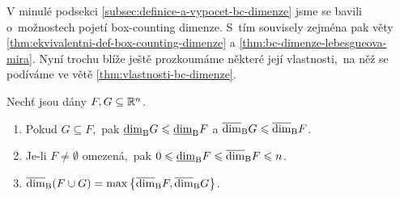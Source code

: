 V minulé podsekci \ref{subsec:definice-a-vypocet-bc-dimenze} jsme se bavili o~možnostech pojetí box-counting dimenze. S~tím souvisely zejména pak věty \ref{thm:ekvivalentni-def-box-counting-dimenze} a \ref{thm:bc-dimenze-lebesgueova-mira}. Nyní trochu blíže ještě prozkoumáme některé její vlastnosti,~na něž se podíváme ve větě \ref{thm:vlastnosti-bc-dimenze}.
\begin{theorem}\label{thm:vlastnosti-bc-dimenze}
    Nechť jsou dány $F,G\subseteq\mathbb{R}^n$.
    \begin{enumerate}[label=(\roman*)]
        \item\label{thm:monotonie-bc-dimenze} Pokud $G\subseteq F$,~pak $\underline{\dim}_\textup{B}{G}\leqslant\underline{\dim}_\textup{B}{F}$ a $\overline{\dim}_\textup{B}{G}\leqslant\overline{\dim}_\textup{B}{F}$.
        \item\label{thm:rozsah-hodnot-bc-dimenze} Je-li $F\neq\emptyset$ omezená,~pak $0\leqslant\underline{\dim}_\textup{B}{F}\leqslant\overline{\dim}_\textup{B}{F}\leqslant n$. 
        \item\label{thm:stabilita-bc-dimenze} $\overline{\dim}_\textup{B}(F\cup G)=\max\left\{\overline{\dim}_\textup{B}{F},\overline{\dim}_\textup{B}{G}\right\}$.
    \end{enumerate}
\end{theorem}
